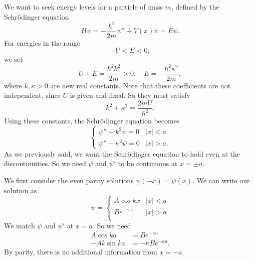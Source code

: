 \documentclass[a4paper]{article}
\begin{document}
We want to seek energy levels for a particle of mass $m$, defined by the Schr\"odinger equation
\[
  H\psi = -\frac{\hbar^2}{2m}\psi'' + V(x) \psi = E\psi.
\]
For energies in the range
\[
  -U < E < 0,
\]
we set
\[
  U + E = \frac{\hbar^2 k^2}{2m} > 0,\quad E = -\frac{\hbar^2 \kappa^2}{2m},
\]
where $k, \kappa > 0$ are new real constants. Note that these coefficients are not independent, since $U$ is given and fixed. So they must satisfy
\[
  k^2 + \kappa^2 = \frac{2mU}{\hbar^2}.
\]
Using these constants, the Schr\"odinger equation becomes
\[
  \begin{cases}
    \psi'' + k^2 \psi = 0 & |x| < a\\
    \psi'' - \kappa^2 \psi = 0 & |x| > a.
  \end{cases}
\]
As we previously said, we want the Schr\"odinger equation to hold even at the discontinuities. So we need $\psi$ and $\psi'$ to be continuous at $x = \pm a$.

We first consider the even parity solutions $\psi(-x) = \psi(x)$. We can write our solution as
\[
  \psi =
  \begin{cases}
    A \cos kx & |x| < a\\
    B e^{-\kappa |x|} & |x| > a\\
  \end{cases}
\]
We match $\psi$ and $\psi'$ at $x = a$. So we need
\begin{align*}
  A\cos ka &= Be^{-\kappa a}\\
  -Ak\sin ka &= -\kappa Be^{-\kappa a}.
\end{align*}
By parity, there is no additional information from $x = -a$.
\end{document}
